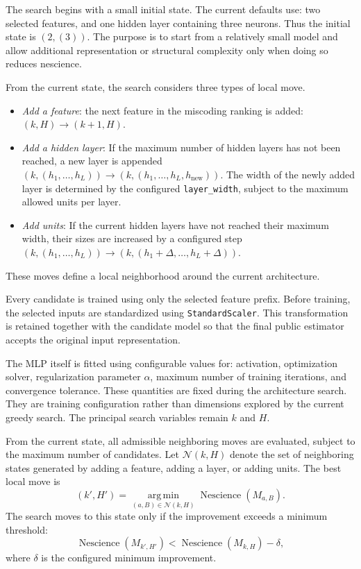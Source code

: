 The search begins with a small initial state. The current defaults use: two selected features, and one hidden layer containing three neurons. Thus the initial state is $(2,(3))$. The purpose is to start from a relatively small model and allow additional representation or structural complexity only when doing so reduces nescience.

From the current state, the search considers three types of local move.

\begin{itemize}

\item \emph{Add a feature}: the next feature in the miscoding ranking is added: $(k,H) \longrightarrow (k+1,H)$.

\item \emph{Add a hidden layer}:  If the maximum number of hidden layers has not been reached, a new layer is appended $(k,(h_1,\ldots,h_L)) \longrightarrow (k,(h_1,\ldots,h_L,h_{\mathrm{new}}))$. The width of the newly added layer is determined by the configured \texttt{layer\_width}, subject to the maximum allowed units per layer.

\item \emph{Add units}: If the current hidden layers have not reached their maximum width, their sizes are increased by a configured step $(k,(h_1,\ldots,h_L)) \longrightarrow (k,(h_1+\Delta,\ldots,h_L+\Delta))$.

\end{itemize}

These moves define a local neighborhood around the current architecture.

Every candidate is trained using only the selected feature prefix. Before training, the selected inputs are standardized using \texttt{StandardScaler}. This transformation is retained together with the candidate model so that the final public estimator accepts the original input representation.

The MLP itself is fitted using configurable values for: activation, optimization solver, regularization parameter $\alpha$, maximum number of training iterations, and convergence tolerance. These quantities are fixed during the architecture search. They are training configuration rather than dimensions explored by the current greedy search. The principal search variables remain $k$ and $H$.

From the current state, all admissible neighboring moves are evaluated, subject to the maximum number of candidates. Let $\mathcal{N}(k,H)$ denote the set of neighboring states generated by adding a feature, adding a
layer, or adding units. The best local move is
\[
(k',H') = \operatorname*{arg\,min}_{(a,B)\in\mathcal{N}(k,H)} \operatorname{Nescience}(M_{a,B}).
\]
The search moves to this state only if the improvement exceeds a minimum
threshold:
\[
\operatorname{Nescience}(M_{k',H'}) < \operatorname{Nescience}(M_{k,H}) - \delta,
\]
where $\delta$ is the configured minimum improvement.

